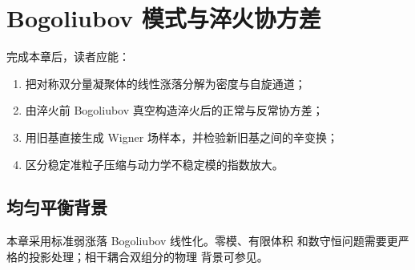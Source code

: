 \chapter{Bogoliubov 模式与淬火协方差}
\label{ch:bogoliubov-quench}

\begin{learningobjectives}
完成本章后，读者应能：
\begin{enumerate}
  \item 把对称双分量凝聚体的线性涨落分解为密度与自旋通道；
  \item 由淬火前 Bogoliubov 真空构造淬火后的正常与反常协方差；
  \item 用旧基直接生成 Wigner 场样本，并检验新旧基之间的辛变换；
  \item 区分稳定准粒子压缩与动力学不稳定模的指数放大。
\end{enumerate}
\end{learningobjectives}

\section{均匀平衡背景}

本章采用标准弱涨落 Bogoliubov 线性化\cite{Dalfovo1999}。零模、有限体积
和数守恒问题需要更严格的投影处理\cite{Castin1998}；相干耦合双组分的物理
背景可参见\cite{Recati2022}。

